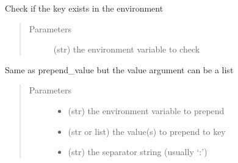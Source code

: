 \documentclass[a4paper,10pt,english]{sphinxmanual}
\begin{document}
\begin{fulllineitems}
\begin{fulllineitems}
\begin{quote}
\begin{description}
\end{description}\end{quote}

\end{fulllineitems}


\begin{fulllineitems}
\label{\detokenize{apidoc_src/src:src.environment.Environ.is_defined}}
Check if the key exists in the environment
\begin{quote}\begin{description}
\item[{Parameters}] \leavevmode
{} \textendash{} (str) the environment variable to check

\end{description}\end{quote}

\end{fulllineitems}


\begin{fulllineitems}
\label{\detokenize{apidoc_src/src:src.environment.Environ.prepend}}
Same as prepend\_value but the value argument can be a list
\begin{quote}\begin{description}
\item[{Parameters}] \leavevmode\begin{itemize}
\item {} 
 \textendash{} (str) the environment variable to prepend

\item {} 
 \textendash{} (str or list) the value(s) to prepend to key

\item {} 
 \textendash{} (str) the separator string (usually ‘:’)

\end{itemize}

\end{description}\end{quote}


\end{fulllineitems}
\end{fulllineitems}
\end{document}
